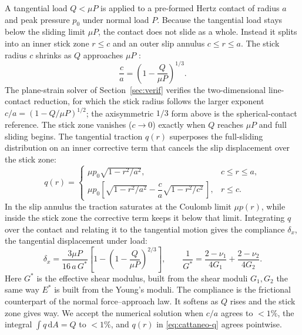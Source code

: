 A tangential load $Q<\mu P$ is applied to a pre-formed Hertz contact of radius $a$ and
peak pressure $p_0$ under normal load $P$. Because the tangential load stays below the
sliding limit $\mu P$, the contact does not slide as a whole. Instead it splits into an
inner stick zone $r\le c$ and an outer slip annulus $c\le r\le a$. The stick radius $c$
shrinks as $Q$ approaches $\mu P$ \citep{mindlin1949compliance,johnson1985contact}:
\begin{equation}\label{eq:cattaneo-c}
  \frac{c}{a} = \left(1-\frac{Q}{\mu P}\right)^{1/3}.
\end{equation}
The plane-strain solver of Section~\ref{sec:verif} verifies the two-dimensional line-contact
reduction, for which the stick radius follows the larger exponent
$c/a = (1-Q/\mu P)^{1/2}$; the axisymmetric $1/3$ form above is the spherical-contact reference.
The stick zone vanishes ($c\to0$) exactly when $Q$ reaches $\mu P$ and full sliding
begins. The tangential traction $q(r)$ superposes the full-sliding distribution on an
inner corrective term that cancels the slip displacement over the stick zone:
\begin{equation}\label{eq:cattaneo-q}
  q(r) =
  \begin{cases}
    \mu p_0\sqrt{1-r^2/a^2}, & c\le r\le a,\\[4pt]
    \mu p_0\!\left[\sqrt{1-r^2/a^2}-\dfrac{c}{a}\sqrt{1-r^2/c^2}\,\right], & r\le c.
  \end{cases}
\end{equation}
In the slip annulus the traction saturates at the Coulomb limit $\mu p(r)$, while inside
the stick zone the corrective term keeps it below that limit. Integrating $q$ over the
contact and relating it to the tangential motion gives the compliance $\delta_x$, the
tangential displacement under load:
\begin{equation}\label{eq:cattaneo-delta}
  \delta_x = \frac{3\mu P}{16\,a\,G^\ast}\!\left[1-\left(1-\frac{Q}{\mu P}\right)^{2/3}\right],
  \qquad
  \frac{1}{G^\ast} = \frac{2-\nu_1}{4G_1}+\frac{2-\nu_2}{4G_2}.
\end{equation}
Here $G^\ast$ is the effective shear modulus, built from the shear moduli $G_1,G_2$ the
same way $E^\ast$ is built from the Young's moduli. The compliance is the frictional
counterpart of the normal force--approach law. It softens as $Q$ rises and the stick zone
gives way. We accept the numerical solution when $c/a$ agrees to $<1\%$, the integral
$\int q\,\mathrm{d}A = Q$ to $<1\%$, and $q(r)$ in \eqref{eq:cattaneo-q} agrees pointwise.

